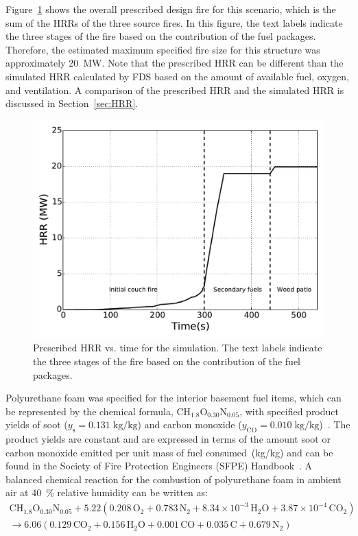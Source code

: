 \documentclass[12pt,oneside]{book}
\renewcommand{\C}{\mbox{C}}
\renewcommand{\H}{\mbox{H}}
\renewcommand{\O}{\mbox{O}}
\newcommand{\N}{\mbox{N}}
\begin{document}
\clearpage


Figure~\ref{fig:hrr} shows the overall prescribed design fire for this scenario, which is the sum of the HRRs of the three source fires. In this figure, the text labels indicate the three stages of the fire based on the contribution of the fuel packages. Therefore, the estimated maximum specified fire size for this structure was approximately 20~MW. Note that the prescribed HRR can be different than the simulated HRR calculated by FDS based on the amount of available fuel, oxygen, and ventilation. A comparison of the prescribed HRR and the simulated HRR is discussed in Section~\ref{sec:HRR}.

\begin{figure}[!ht]
\includegraphics[width=5.5in]{../Figures/Fire_HRR}
\caption[Prescribed HRR vs. time for the simulation.]
{Prescribed HRR vs. time for the simulation. The text labels indicate the three stages of the fire based on the contribution of the fuel packages.}
\label{fig:hrr}
\end{figure}

Polyurethane foam was specified for the interior basement fuel items, which can be represented by the chemical formula, $\C\H_{1.8}\O_{0.30}\N_{0.05}$, with specified product yields of soot ($y_{\mathrm{s}}=0.131 \; \mathrm{kg}/\mathrm{kg}$) and carbon monoxide ($y_{\mathrm{CO}}=0.010 \; \mathrm{kg}/\mathrm{kg}$)~\cite{SFPE:Tewarson}. The product yields are constant and are expressed in terms of the amount soot or carbon monoxide emitted per unit mass of fuel consumed~(kg/kg) and can be found in the Society of Fire Protection Engineers (SFPE) Handbook~\cite{SFPE:Tewarson}. A balanced chemical reaction for the combustion of polyurethane foam in ambient air at 40~\% relative humidity can be written as:
\begin{multline}
\C\H_{1.8}\O_{0.30}\N_{0.05} + 5.22(0.208\,\O_{2} + 0.783\,\N_{2} + 8.34 \times 10^{-3}\,\H_{2}\O + 3.87 \times 10^{-4}\,\C\O_{2}) \\
\rightarrow 6.06(0.129\,\C\O_{2} + 0.156\,\H_{2}\O + 0.001\,\C\O + 0.035\,\C + 0.679\,\N_{2})
\label{eq:fuel_polyurethane}
\end{multline}
\end{document}
